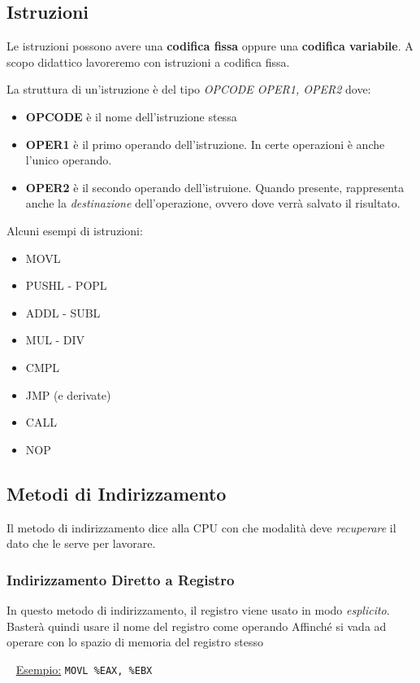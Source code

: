 \documentclass[a4paper,11pt,oneside]{book}
\begin{document}
\subsection{Istruzioni}
Le istruzioni possono avere una \textbf{codifica fissa} oppure una \textbf{codifica variabile}.
A scopo didattico lavoreremo con istruzioni a codifica fissa.

\noindent La struttura di un'istruzione è del tipo \emph{OPCODE OPER1, OPER2} dove:
\begin{itemize}
    \item \textbf{OPCODE} è il nome dell'istruzione stessa
    \item \textbf{OPER1} è il primo operando dell'istruzione. In certe operazioni è anche l'unico operando.
    \item \textbf{OPER2} è il secondo operando dell'istruione. Quando presente, rappresenta anche la \emph{destinazione} dell'operazione, ovvero dove
          verrà salvato il risultato.
\end{itemize}

\noindent Alcuni esempi di istruzioni:
\begin{itemize}
    \item MOVL
    \item PUSHL - POPL
    \item ADDL - SUBL
    \item MUL - DIV
    \item CMPL
    \item JMP (e derivate)
    \item CALL
    \item NOP
\end{itemize}

\subsection{Metodi di Indirizzamento}
Il metodo di indirizzamento dice alla CPU con che modalità deve \emph{recuperare} il dato che le serve per lavorare.

\subsubsection{Indirizzamento Diretto a Registro}
In questo metodo di indirizzamento, il registro viene usato in modo \emph{esplicito}. Basterà quindi usare il nome del registro come operando Affinché
si vada ad operare con lo spazio di memoria del registro stesso

~\newline
\underline{Esempio:} \tabto{3cm} \texttt{MOVL \%EAX, \%EBX}
\end{document}
